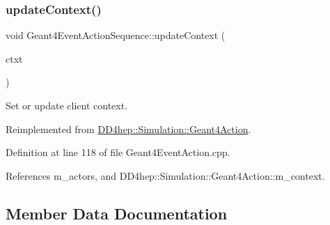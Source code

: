 \hypertarget{class_d_d4hep_1_1_simulation_1_1_geant4_event_action_sequence_a26291513e94aec2a01464d0121532999}{}\label{class_d_d4hep_1_1_simulation_1_1_geant4_event_action_sequence_a26291513e94aec2a01464d0121532999} 
\subsubsection{\texorpdfstring{update\+Context()}{updateContext()}}
{\footnotesize\ttfamily void Geant4\+Event\+Action\+Sequence\+::update\+Context (\begin{DoxyParamCaption}\item[{\hyperlink{class_d_d4hep_1_1_simulation_1_1_geant4_context}{Geant4\+Context} $\ast$}]{ctxt }\end{DoxyParamCaption})\hspace{0.3cm}{\ttfamily [virtual]}}



Set or update client context. 



Reimplemented from \hyperlink{class_d_d4hep_1_1_simulation_1_1_geant4_action_ae3b9daf2af881df956c46568c0743313}{D\+D4hep\+::\+Simulation\+::\+Geant4\+Action}.



Definition at line 118 of file Geant4\+Event\+Action.\+cpp.



References m\+\_\+actors, and D\+D4hep\+::\+Simulation\+::\+Geant4\+Action\+::m\+\_\+context.



\subsection{Member Data Documentation}
\hypertarget{class_d_d4hep_1_1_simulation_1_1_geant4_event_action_sequence_a6b3b349d21a34103e1e070a6488bb0e5}{}\label{class_d_d4hep_1_1_simulation_1_1_geant4_event_action_sequence_a6b3b349d21a34103e1e070a6488bb0e5} 
